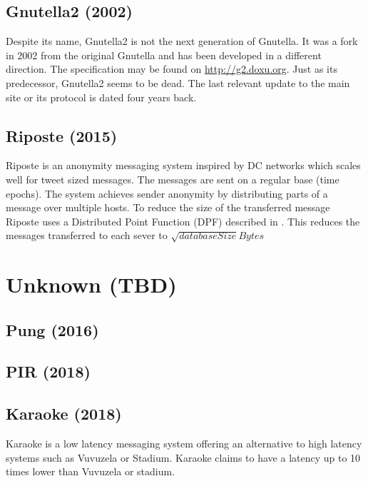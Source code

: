 \subsection{Gnutella2 (2002)}
Despite its name, Gnutella2 is not the next generation of Gnutella. It was a fork in 2002 from the original Gnutella and has been developed in a different direction. The specification may be found on \url{http://g2.doxu.org}. Just as its predecessor, Gnutella2 seems to be dead. The last relevant update to the main site or its protocol is dated four years back.

\subsection{Riposte (2015)}
Riposte\cite{corrigan2015riposte} is an anonymity messaging system inspired by DC networks which scales well for tweet sized messages. The messages are sent on a regular base (time epochs). The system achieves sender anonymity by distributing parts of a message over multiple hosts. To reduce the size of the transferred message Riposte uses a Distributed Point Function (DPF) described in \cite{gilboa2014distributed}. This reduces the messages transferred to each sever to $\sqrt{databaseSize} Bytes$

%

\section{Unknown (TBD)}

\subsection{Pung (2016)}
\cite{angel2016unobservable}

%

\subsection{PIR (2018)}
\cite{angel2018pir}

%

\subsection{Karaoke (2018)}
Karaoke\cite{lazar2018karaoke} is a low latency messaging system offering an alternative to high latency systems such as Vuvuzela or Stadium. Karaoke claims to have a latency up to 10 times lower than Vuvuzela or stadium.

